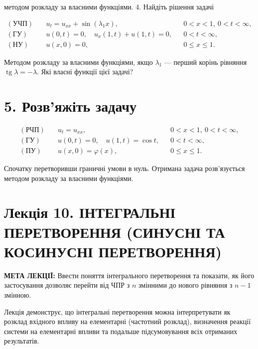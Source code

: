 \documentclass[
  ukrainian,
]{article}
\begin{document}
методом розкладу за власними функціями. 4. Найдіть рішення задачі

\[
\begin{aligned}
(\text{УЧП})\quad & u_t = u_{xx} + \sin(\lambda_1 x), && 0 < x < 1,\ 0 < t < \infty, \\
(\text{ГУ})\quad & u(0,t) = 0,\quad u_x(1,t) + u(1,t) = 0, && 0 < t < \infty, \\
(\text{НУ})\quad & u(x,0) = 0, && 0 \leqslant x \leqslant 1.
\end{aligned}
\]

Методом розкладу за власними функціями, якщо \(\lambda_1\) --- перший
корінь рівняння \(\operatorname{tg}\lambda = -\lambda\). Які власні
функції цієї задачі?

\section{5. Розв'яжіть
задачу}\label{ux440ux43eux437ux432ux44fux436ux456ux442ux44c-ux437ux430ux434ux430ux447ux443-1}

\[
\begin{aligned}
(\text{РЧП})\quad & u_t = u_{xx}, && 0 < x < 1,\ 0 < t < \infty, \\
(\text{ГУ})\quad & u(0,t) = 0,\quad u(1,t) = \cos t, && 0 < t < \infty, \\
(\text{ПУ})\quad & u(x,0) = \varphi(x), && 0 \leqslant x \leqslant 1.
\end{aligned}
\]

Спочатку перетворивши граничні умови в нуль. Отримана задача
розв'язується методом розкладу за власними функціями.

\section{Лекція 10. ІНТЕГРАЛЬНІ ПЕРЕТВОРЕННЯ (СИНУСНІ ТА КОСИНУСНІ
ПЕРЕТВОРЕННЯ)}\label{ux43bux435ux43aux446ux456ux44f-10.-ux456ux43dux442ux435ux433ux440ux430ux43bux44cux43dux456-ux43fux435ux440ux435ux442ux432ux43eux440ux435ux43dux43dux44f-ux441ux438ux43dux443ux441ux43dux456-ux442ux430-ux43aux43eux441ux438ux43dux443ux441ux43dux456-ux43fux435ux440ux435ux442ux432ux43eux440ux435ux43dux43dux44f}

\textbf{МЕТА ЛЕКЦІЇ:} Ввести поняття інтегрального перетворення та
показати, як його застосування дозволяє перейти від ЧПР з \(n\) змінними
до нового рівняння з \(n - 1\) змінною.

Лекція демонструє, що інтегральні перетворення можна інтерпретувати як
розклад вхідного впливу на елементарні (частотний розклад), визначення
реакції системи на елементарні впливи та подальше підсумовування всіх
отриманих результатів.
\end{document}
